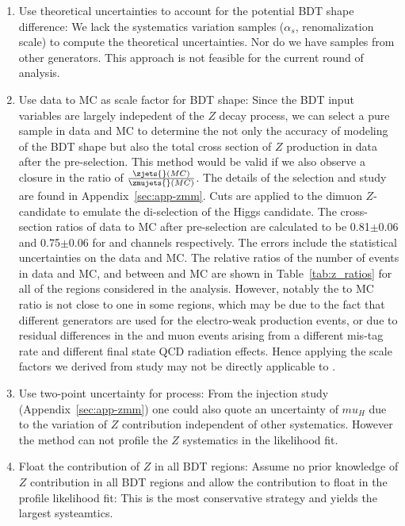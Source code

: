 \begin{enumerate}

\item Use \zjets{} theoretical uncertainties to account for the potential BDT shape difference: We lack the systematics variation samples ($\alpha_s$, renomalization scale) to compute the theoretical uncertainties. Nor do we have \zjets{} samples from other generators. This approach is not feasible for the current round of analysis. 

\item Use data to MC \zmujets{} as scale factor for \zjets{} BDT shape: Since the BDT input variables are largely indepedent of the $Z$ decay process, we can select a pure \zmujets{} sample in data and MC to determine the not only the accuracy of modeling of the \zjets{} BDT shape but also the total cross section of $Z$ production in data after the pre-selection. This method would be valid if we also observe a closure in the ratio of $\frac{\zjets{}(MC)}{\zmujets{}(MC)}$. The details of the \zmujets{} selection and study are found in Appendix~\ref{sec:app-zmm}.  Cuts are applied to the dimuon $Z$-candidate to emulate the di-\bjet selection of the Higgs candidate. The cross-section ratios of data to MC after pre-selection are calculated to be 0.81$\pm$0.06 and 0.75$\pm$0.06 for \twocentral and \fourcentral channels respectively. The errors include the statistical uncertainties on the data and MC. The relative ratios of the number of events in data and MC, and between \zjets{} and \zmujets{} MC are shown in Table~\ref{tab:z_ratios} for all of the regions considered in the analysis. However, notably the \zmujets{} to \zjets MC ratio is not close to one in some regions, which may be due to the fact that different generators are used for the electro-weak production events, or due to residual differences in the \bjet and muon events arising from a different mis-tag rate and different final state QCD radiation effects. Hence applying the scale factors we derived from \zmujets{} study may not be directly applicable to \zjets{}. 

\item Use two-point uncertainty for \zjets{} process: From the injection study (Appendix~\ref{sec:app-zmm}) one could also quote an uncertainty of $mu_H$ due to the variation of $Z$ contribution independent of other systematics. However the method can not profile the $Z$ systematics in the likelihood fit. 

\item \label{item:z-treat-4} Float the contribution of $Z$ in all BDT regions: Assume no prior knowledge of $Z$ contribution in all BDT regions and allow the contribution to float in the profile likelihood fit: This is the most conservative strategy and yields the largest systeamtics. 


\end{enumerate}

